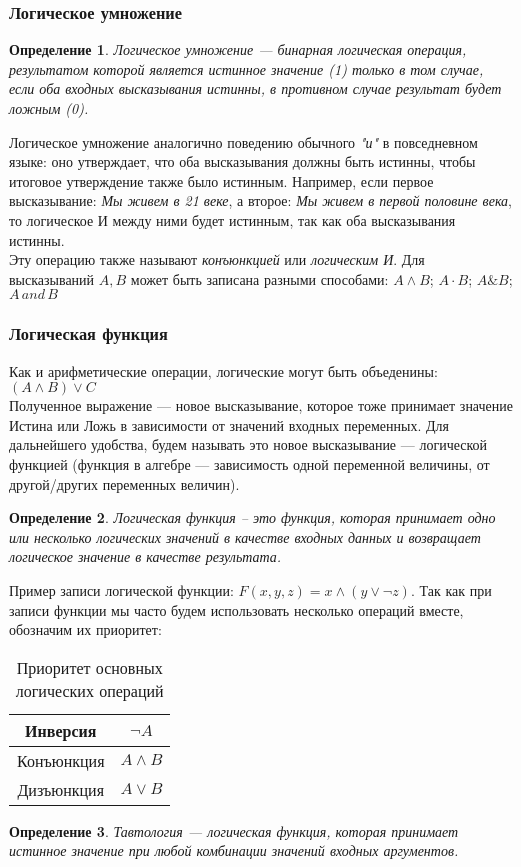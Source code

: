 \documentclass[12pt]{article}
\newtheorem{definition}{Определение}[section]
\theoremstyle{problem_style}
\begin{document}
\subsubsection{Логическое умножение}
\begin{definition}
Логическое умножение —  бинарная логическая операция, результатом которой является истинное значение (1) только в том случае, если оба входных высказывания истинны, в противном случае результат будет ложным (0).
\end{definition}
Логическое умножение аналогично поведению обычного \textit{"и"} в повседневном языке: оно утверждает, что оба высказывания должны быть истинны, чтобы итоговое утверждение также было истинным. Например, если первое высказывание: \textit{Мы живем в 21 веке}, а второе: \textit{Мы живем в первой половине века}, то логическое И между ними будет истинным, так как оба высказывания истинны.\\
Эту операцию также называют \textit{конъюнкцией} или \textit{логическим И}. Для высказываний $A, B$ может быть записана разными способами: \(A \land B\); \( A \cdot B \); \( A \& B \); \( A\,and\,B \)

\subsubsection{Логическая функция}
Как и арифметические операции, логические могут быть объеденины: \((A \land B) \lor C\)\\
Полученное выражение — новое высказывание, которое тоже принимает значение Истина или Ложь в зависимости от значений входных переменных. Для дальнейшего удобства, будем называть это новое высказывание — логической функцией (функция в алгебре — зависимость одной переменной величины, от другой/других переменных величин).
\begin{definition}
Логическая функция – это функция, которая принимает одно или несколько логических значений в качестве входных данных и возвращает логическое значение в качестве результата.
\end{definition} 
Пример записи логической функции: \(F(x, y, z) = x \land (y \lor \lnot z)\).
Так как при записи функции мы часто будем использовать несколько операций вместе, обозначим их приоритет:
\begin{table}[h]
    \centering
    \begin{tabular}{c|c}
         Инверсия & \(\lnot A\) \\ \hline
         Конъюнкция & \(A \land B\) \\ \hline
         Дизъюнкция & \(A \lor B\) \\ 
    \end{tabular}
    \caption{Приоритет основных логических операций}
    \label{tab:lops_priority_1}
\end{table}
\begin{definition}
Тавтология — логическая функция, которая принимает истинное значение при любой комбинации значений входных аргументов.
\end{definition}
\end{document}
